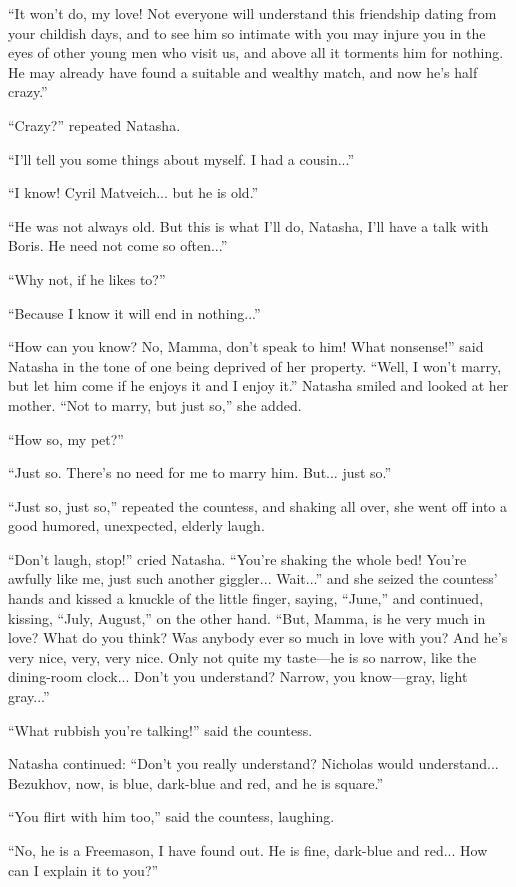 ``It won't do, my love! Not everyone will understand this
friendship dating from your childish days, and to see him so
intimate with you may injure you in the eyes of other young men
who visit us, and above all it torments him for nothing. He may
already have found a suitable and wealthy match, and now he's
half crazy.''

``Crazy?'' repeated Natasha.

``I'll tell you some things about myself. I had a cousin...''

``I know! Cyril Matveich... but he is old.''

``He was not always old. But this is what I'll do, Natasha, I'll
have a talk with Boris. He need not come so often...''

``Why not, if he likes to?''

``Because I know it will end in nothing...''

``How can you know? No, Mamma, don't speak to him! What
nonsense!'' said Natasha in the tone of one being deprived of her
property. ``Well, I won't marry, but let him come if he enjoys it
and I enjoy it.'' Natasha smiled and looked at her mother. ``Not
to marry, but just so,'' she added.

``How so, my pet?''

``Just so. There's no need for me to marry him. But... just so.''

``Just so, just so,'' repeated the countess, and shaking all
over, she went off into a good humored, unexpected, elderly
laugh.

``Don't laugh, stop!'' cried Natasha. ``You're shaking the whole
bed!  You're awfully like me, just such another
giggler... Wait...'' and she seized the countess' hands and
kissed a knuckle of the little finger, saying, ``June,'' and
continued, kissing, ``July, August,'' on the other hand. ``But,
Mamma, is he very much in love? What do you think? Was anybody
ever so much in love with you? And he's very nice, very, very
nice. Only not quite my taste---he is so narrow, like the
dining-room clock... Don't you understand? Narrow, you
know---gray, light gray...''

``What rubbish you're talking!'' said the countess.

Natasha continued: ``Don't you really understand? Nicholas would
understand... Bezukhov, now, is blue, dark-blue and red, and he
is square.''

``You flirt with him too,'' said the countess, laughing.

``No, he is a Freemason, I have found out. He is fine, dark-blue
and red... How can I explain it to you?''

